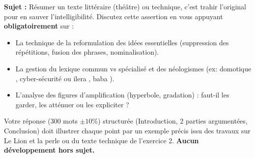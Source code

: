\documentclass[11pt]{article}
\begin{document}
\begin{exercice}
\textbf{Sujet :} \og Résumer un texte littéraire (théâtre) ou technique, c'est trahir l'original pour en sauver l'intelligibilité. \fg{} Discutez cette assertion en vous appuyant \textbf{obligatoirement} sur :
\begin{itemize}
    \item[-] La technique de la \og reformulation des idées essentielles \fg{} (suppression des répétitions, fusion des phrases, nominalisation).
    \item[-] La gestion du \og lexique commun vs spécialisé \fg{} et des \og néologismes \fg{} (ex: \og domotique \fg{}, \og cyber-sécurité \fg{} ou \og ilera \fg{}, \og baba \fg{}).
    \item[-] L'analyse des \og figures d'amplification \fg{} (hyperbole, gradation) : faut-il les garder, les atténuer ou les expliciter ?
\end{itemize}
Votre réponse (300 mots $\pm 10\%$) structurée (Introduction, 2 parties argumentées, Conclusion) doit illustrer chaque point par un exemple précis issu des travaux sur \og Le Lion et la perle \fg{} ou du texte technique de l'exercice 2. \textbf{Aucun développement hors sujet.}
\end{exercice}
\end{document}

